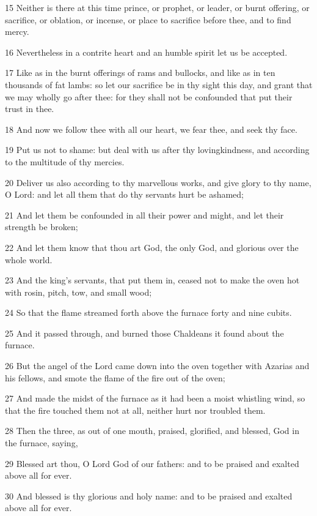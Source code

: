 \par 15 Neither is there at this time prince, or prophet, or leader, or burnt offering, or sacrifice, or oblation, or incense, or place to sacrifice before thee, and to find mercy.
\par 16 Nevertheless in a contrite heart and an humble spirit let us be accepted.
\par 17 Like as in the burnt offerings of rams and bullocks, and like as in ten thousands of fat lambs: so let our sacrifice be in thy sight this day, and grant that we may wholly go after thee: for they shall not be confounded that put their trust in thee.
\par 18 And now we follow thee with all our heart, we fear thee, and seek thy face.
\par 19 Put us not to shame: but deal with us after thy lovingkindness, and according to the multitude of thy mercies.
\par 20 Deliver us also according to thy marvellous works, and give glory to thy name, O Lord: and let all them that do thy servants hurt be ashamed;
\par 21 And let them be confounded in all their power and might, and let their strength be broken;
\par 22 And let them know that thou art God, the only God, and glorious over the whole world.
\par 23 And the king's servants, that put them in, ceased not to make the oven hot with rosin, pitch, tow, and small wood;
\par 24 So that the flame streamed forth above the furnace forty and nine cubits.
\par 25 And it passed through, and burned those Chaldeans it found about the furnace.
\par 26 But the angel of the Lord came down into the oven together with Azarias and his fellows, and smote the flame of the fire out of the oven;
\par 27 And made the midst of the furnace as it had been a moist whistling wind, so that the fire touched them not at all, neither hurt nor troubled them.
\par 28 Then the three, as out of one mouth, praised, glorified, and blessed, God in the furnace, saying,
\par 29 Blessed art thou, O Lord God of our fathers: and to be praised and exalted above all for ever.
\par 30 And blessed is thy glorious and holy name: and to be praised and exalted above all for ever.
